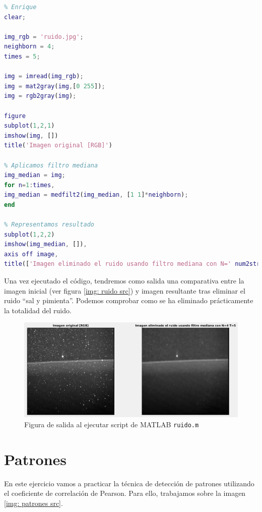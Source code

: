 \documentclass[12pt]{article}
\begin{document}
	\begin{lstlisting}[language=Matlab, caption={Implementación filtro mediana para reducir ruido en \texttt{MATLAB}}]
% 6 - Ruido Sal y Pimienta
% Enrique
clear;

img_rgb = 'ruido.jpg';
neighborn = 4;
times = 5;

img = imread(img_rgb);
img = mat2gray(img,[0 255]);
img = rgb2gray(img);

figure
subplot(1,2,1)
imshow(img, [])
title('Imagen original [RGB]')

% Aplicamos filtro mediana
img_median = img;
for n=1:times,
img_median = medfilt2(img_median, [1 1]*neighborn);
end

% Representamos resultado
subplot(1,2,2)
imshow(img_median, []),
axis off image,
title(['Imagen eliminado el ruido usando filtro mediana con N=' num2str(neighborn) ' T=' num2str(times) ])
	\end{lstlisting}

	\vspace{10px}

	\noindent Una vez ejecutado el código, tendremos como salida una comparativa entre la imagen inicial (ver figura \ref{img: ruido src}) y imagen resultante tras eliminar el ruido ``sal y pimienta''. Podemos comprobar como se ha eliminado prácticamente la totalidad del ruido.
	
	\begin{figure}[h]
		\begin{center}
			\includegraphics[width=1\textwidth]{img/ruido_output.png}
			\caption{Figura de salida al ejecutar script de MATLAB \texttt{ruido.m}}
			\label{img: ruido output}
		\end{center}
	\end{figure}
	
	\pagebreak
	
	\section{Patrones}
	\noindent En este ejercicio vamos a practicar la técnica de detección de patrones utilizando el coeficiente de correlación de Pearson. Para ello, trabajamos sobre la imagen \ref{img: patrones src}.
	
\end{document}
